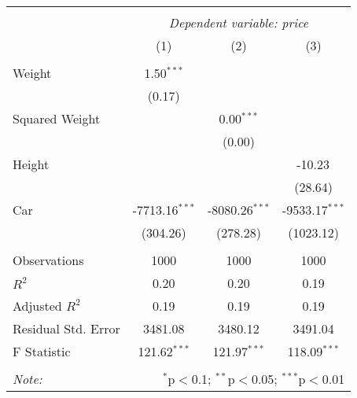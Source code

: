 \begin{table}[!htbp] \centering
\begin{tabular}{@{\extracolsep{5pt}}lccc}
\\[-1.8ex]\hline
\hline \\[-1.8ex]
& \multicolumn{3}{c}{\textit{Dependent variable: price}} \
\cr \cline{2-4}
\\[-1.8ex] & (1) & (2) & (3) \\
\hline \\[-1.8ex]
 Weight & 1.50$^{***}$ & & \\
& (0.17) & & \\
 Squared Weight & & 0.00$^{***}$ & \\
& & (0.00) & \\
 Height & & & -10.23$^{}$ \\
& & & (28.64) \\
 Car & -7713.16$^{***}$ & -8080.26$^{***}$ & -9533.17$^{***}$ \\
& (304.26) & (278.28) & (1023.12) \\
\hline \\[-1.8ex]
 Observations & 1000 & 1000 & 1000 \\
 $R^2$ & 0.20 & 0.20 & 0.19 \\
 Adjusted $R^2$ & 0.19 & 0.19 & 0.19 \\
 Residual Std. Error & 3481.08 & 3480.12 & 3491.04 \\
 F Statistic & 121.62$^{***}$ & 121.97$^{***}$ & 118.09$^{***}$ \\
\hline
\hline \\[-1.8ex]
\textit{Note:} & \multicolumn{3}{r}{$^{*}$p$<$0.1; $^{**}$p$<$0.05; $^{***}$p$<$0.01} \\
\end{tabular}
\end{table}